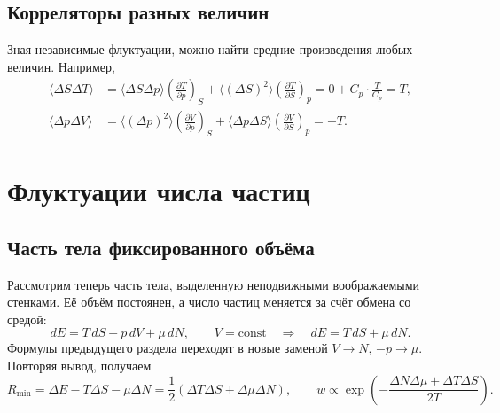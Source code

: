 \documentclass[../final.tex]{subfiles}
\begin{document}
\subsection{Корреляторы разных величин}
Зная независимые флуктуации, можно найти средние произведения любых величин.
Например,
\begin{align*}
 \langle\Delta S\Delta T\rangle
 &=\langle\Delta S\Delta p\rangle\left(\frac{\partial T}{\partial p}\right)_S
 +\langle(\Delta S)^2\rangle\left(\frac{\partial T}{\partial S}\right)_p
 =0+C_p\cdot\frac{T}{C_p}=T,\\
 \langle\Delta p\Delta V\rangle
 &=\langle(\Delta p)^2\rangle\left(\frac{\partial V}{\partial p}\right)_S
 +\langle\Delta p\Delta S\rangle\left(\frac{\partial V}{\partial S}\right)_p
 =-T.
\end{align*}

\section{Флуктуации числа частиц}
\subsection{Часть тела фиксированного объёма}
Рассмотрим теперь часть тела, выделенную неподвижными воображаемыми стенками.
Её объём постоянен, а число частиц меняется за счёт обмена со средой:
\begin{equation*}
 dE=T\,dS-p\,dV+\mu\,dN,\qquad V=\mathrm{const}
 \quad\Longrightarrow\quad dE=T\,dS+\mu\,dN.
\end{equation*}
Формулы предыдущего раздела переходят в новые заменой
$V\to N$, $-p\to\mu$. Повторяя вывод, получаем
\begin{equation*}
 R_{\min}=\Delta E-T\Delta S-\mu\Delta N
 =\frac12(\Delta T\Delta S+\Delta\mu\Delta N),\qquad
 w\propto\exp\left(-\frac{\Delta N\Delta\mu+\Delta T\Delta S}{2T}\right).
\end{equation*}
\end{document}
